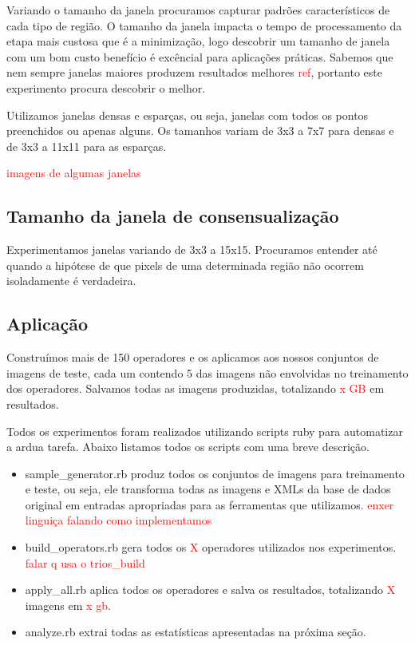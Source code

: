 \documentclass[a4paper,11pt]{article}
\newcommand{\TODO}[1]{\textcolor{red}{#1}}
\begin{document}
    Variando o tamanho da janela procuramos capturar padrões característicos de cada tipo de região. O tamanho da janela impacta o tempo de processamento da etapa mais custosa que é a minimização, logo descobrir um tamanho de janela com um bom custo benefício é excêncial para aplicações práticas. Sabemos que nem sempre janelas maiores produzem resultados melhores \TODO{ref}, portanto este experimento procura descobrir o melhor.

    Utilizamos janelas densas e esparças, ou seja, janelas com todos os pontos preenchidos ou apenas alguns. Os tamanhos variam de 3x3 a 7x7 para densas e de 3x3 a 11x11 para as esparças.

    \TODO{imagens de algumas janelas}

  \subsection{Tamanho da janela de consensualização}

    Experimentamos janelas variando de 3x3 a 15x15. Procuramos entender até quando a hipótese de que pixels de uma determinada região não ocorrem isoladamente é verdadeira.

  \subsection{Aplicação}

    Construímos mais de 150 operadores e os aplicamos aos nossos conjuntos de imagens de teste, cada um contendo 5 das imagens não envolvidas no treinamento dos operadores. Salvamos todas as imagens produzidas, totalizando \TODO{x GB} em resultados.

    Todos os experimentos foram realizados utilizando scripts ruby para automatizar a ardua tarefa. Abaixo listamos todos os scripts com uma breve descrição.

    \begin{itemize}
      \item sample\_generator.rb produz todos os conjuntos de imagens para treinamento e teste, ou seja, ele transforma todas as imagens e XMLs da base de dados original em entradas apropriadas para as ferramentas que utilizamos. \TODO{enxer linguiça falando como implementamos}
      \item build\_operators.rb gera todos os \TODO{X} operadores utilizados nos experimentos. \TODO{falar q usa o trios\_build}
      \item apply\_all.rb aplica todos os operadores e salva os resultados, totalizando \TODO{X} imagens em \TODO{x gb}.
      \item analyze.rb extrai todas as estatísticas apresentadas na próxima seção.
    \end{itemize}
\end{document}
